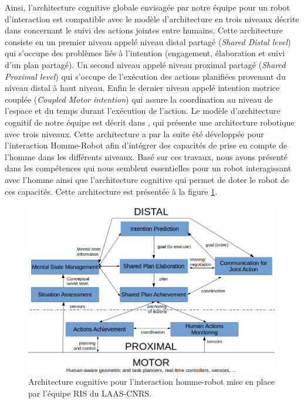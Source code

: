 \documentclass[a4paper,11pt,twoside]{StyleThese}
\begin{document}
Ainsi, l'architecture cognitive globale envisagée par notre équipe pour un robot d'interaction est compatible avec le modèle d'architecture en trois niveaux décrite dans \cite{pacherie2012phenomenology} concernant le suivi des actions jointes entre humains. Cette architecture consiste en un premier niveau appelé niveau distal partagé (\textit{Shared Distal level}) qui s'occupe des problèmes liés à l'intention (engagement, élaboration et suivi d'un plan partagé). Un second niveau appelé niveau proximal partagé (\textit{Shared Proximal level}) qui s'occupe de l'exécution des actions planifiées provenant du niveau distal à haut niveau. Enfin le dernier niveau appelé  intention motrice couplée (\textit{Coupled Motor intention}) qui assure la coordination au niveau de l'espace et du temps durant l'exécution de l'action.
Le modèle d'architecture cognitif de notre équipe est décrit dans \cite{alami1998architecture}, qui présente une architecture robotique avec trois niveaux. Cette architecture a par la suite été développée pour l'interaction Homme-Robot \cite{alami2011robot,alami2013human,fioreiser2014} afin d'intégrer des capacités de prise en compte de l'homme dans les différents niveaux. 
Basé sur ces travaux, nous avons présenté dans \cite{Devin16} les compétences qui nous semblent essentielles pour un robot interagissant avec l'homme ainsi que l'architecture cognitive qui permet de doter le robot de ces capacités.
Cette architecture est présentée à la figure \ref{fig:archiglobal}.



\begin{figure}[!t]
        \centering
          \includegraphics[width=0.99\textwidth]{img/cogarch.png}
    \caption{Architecture cognitive pour l'interaction homme-robot mise en place par l'équipe RIS du LAAS-CNRS.}
       \label{fig:archiglobal}
\end{figure}
\end{document}
